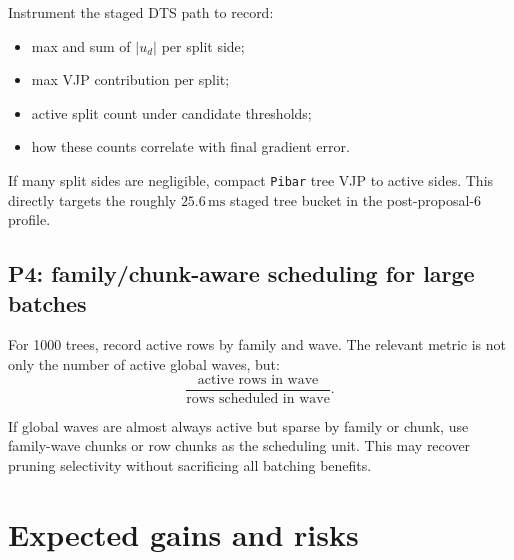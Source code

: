 \documentclass[11pt]{article}
\newcommand{\ms}{\,\mathrm{ms}}
\newcommand{\code}[1]{\texttt{#1}}
\begin{document}
Instrument the staged DTS path to record:

\begin{itemize}[leftmargin=*]
\item max and sum of \(|u_d|\) per split side;
\item max VJP contribution per split;
\item active split count under candidate thresholds;
\item how these counts correlate with final gradient error.
\end{itemize}

If many split sides are negligible, compact \code{Pibar} tree VJP to active
sides.  This directly targets the roughly $25.6\ms$ staged tree bucket in the
post-proposal-6 profile.

\subsection{P4: family/chunk-aware scheduling for large batches}

For 1000 trees, record active rows by family and wave.  The relevant metric is
not only the number of active global waves, but:
\[
  \frac{\text{active rows in wave}}{\text{rows scheduled in wave}}.
\]

If global waves are almost always active but sparse by family or chunk, use
family-wave chunks or row chunks as the scheduling unit.  This may recover
pruning selectivity without sacrificing all batching benefits.

\section{Expected gains and risks}
\end{document}
